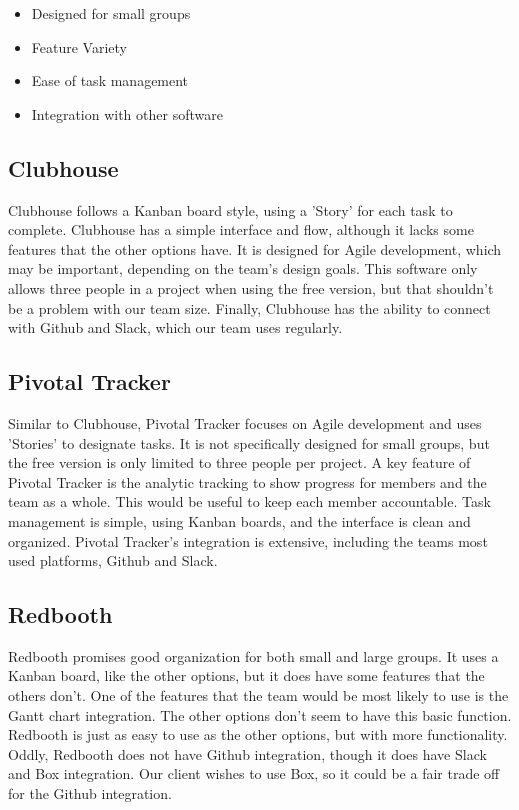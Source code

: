 \documentclass[capstone.tex]{subfiles}
\begin{document}
\begin{itemize}
    \item Designed for small groups
    \item Feature Variety
    \item Ease of task management
    \item Integration with other software
\end{itemize}

\subsection{Clubhouse}
Clubhouse follows a Kanban board style, using a 'Story' for each task to complete. Clubhouse has a simple interface and flow, although it lacks some features that the other options have. It is designed for Agile development, which may be important, depending on the team's design goals. This software only allows three people in a project when using the free version, but that shouldn't be a problem with our team size. Finally, Clubhouse has the ability to connect with Github and Slack, which our team uses regularly.
\cite{clubhouse}
\subsection{Pivotal Tracker}
Similar to Clubhouse, Pivotal Tracker focuses on Agile development and uses 'Stories' to designate tasks. It is not specifically designed for small groups, but the free version is only limited to three people per project. A key feature of Pivotal Tracker is the analytic tracking to show progress for members and the team as a whole. This would be useful to keep each member accountable. Task management is simple, using Kanban boards, and the interface is clean and organized. Pivotal Tracker's integration is extensive, including the teams most used platforms, Github and Slack.
\cite{pivotaltracker}
\subsection{Redbooth}
Redbooth promises good organization for both small and large groups. It uses a Kanban board, like the other options, but it does have some features that the others don't. One of the features that the team would be most likely to use is the Gantt chart integration. The other options don't seem to have this basic function. Redbooth is just as easy to use as the other options, but with more functionality. Oddly, Redbooth does not have Github integration, though it does have Slack and Box integration. Our client wishes to use Box, so it could be a fair trade off for the Github integration.
\cite{redbooth}
\end{document}
